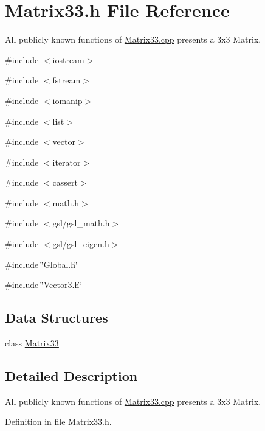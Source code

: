 \section{Matrix33.h File Reference}
\label{Matrix33_8h}


All publicly known functions of \hyperlink{Matrix33_8cpp}{Matrix33.cpp} presents a 3x3 Matrix.  


{\ttfamily \#include $<$iostream$>$}\par
{\ttfamily \#include $<$fstream$>$}\par
{\ttfamily \#include $<$iomanip$>$}\par
{\ttfamily \#include $<$list$>$}\par
{\ttfamily \#include $<$vector$>$}\par
{\ttfamily \#include $<$iterator$>$}\par
{\ttfamily \#include $<$cassert$>$}\par
{\ttfamily \#include $<$math.h$>$}\par
{\ttfamily \#include $<$gsl/gsl\_\-math.h$>$}\par
{\ttfamily \#include $<$gsl/gsl\_\-eigen.h$>$}\par
{\ttfamily \#include \char`\"{}Global.h\char`\"{}}\par
{\ttfamily \#include \char`\"{}Vector3.h\char`\"{}}\par
\subsection*{Data Structures}
\begin{DoxyCompactItemize}
\item 
class \hyperlink{classMatrix33}{Matrix33}
\end{DoxyCompactItemize}


\subsection{Detailed Description}
All publicly known functions of \hyperlink{Matrix33_8cpp}{Matrix33.cpp} presents a 3x3 Matrix. 

Definition in file \hyperlink{Matrix33_8h_source}{Matrix33.h}.

